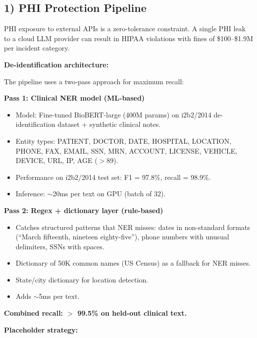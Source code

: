 \subsection*{1) PHI Protection Pipeline}

PHI exposure to external APIs is a zero-tolerance constraint. A single PHI leak to a cloud LLM provider can result in HIPAA violations with fines of \$100--\$1.9M per incident category.

\textbf{De-identification architecture:}

The pipeline uses a two-pass approach for maximum recall:

\textbf{Pass 1: Clinical NER model (ML-based)}
\begin{itemize}
  \item Model: Fine-tuned BioBERT-large (400M params) on i2b2/2014 de-identification dataset + synthetic clinical notes.
  \item Entity types: PATIENT, DOCTOR, DATE, HOSPITAL, LOCATION, PHONE, FAX, EMAIL, SSN, MRN, ACCOUNT, LICENSE, VEHICLE, DEVICE, URL, IP, AGE ($>$89).
  \item Performance on i2b2/2014 test set: F1 = 97.8\%, recall = 98.9\%.
  \item Inference: $\sim$20ms per text on GPU (batch of 32).
\end{itemize}

\textbf{Pass 2: Regex + dictionary layer (rule-based)}
\begin{itemize}
  \item Catches structured patterns that NER misses: dates in non-standard formats (``March fifteenth, nineteen eighty-five''), phone numbers with unusual delimiters, SSNs with spaces.
  \item Dictionary of 50K common names (US Census) as a fallback for NER misses.
  \item State/city dictionary for location detection.
  \item Adds $\sim$5ms per text.
\end{itemize}

\textbf{Combined recall: $>$ 99.5\% on held-out clinical text.}

\textbf{Placeholder strategy:}

